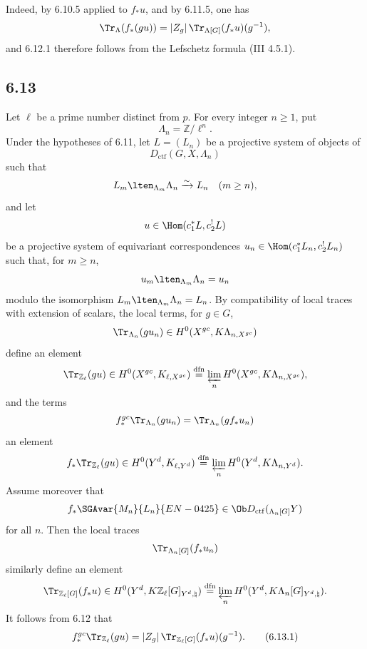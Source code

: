 Indeed, by 6.10.5 applied to $f_*u$, and by 6.11.5, one has
\[
\Tr_{\Lambda}(f_*(gu))=|Z_g|\,\Tr_{\Lambda[G]}(f_*u)(g^{-1}),
\]
and 6.12.1 therefore follows from the Lefschetz formula (III 4.5.1).

\subsection*{6.13}
Let $\ell$ be a prime number distinct from $p$. For every integer $n\ge1$, put
\[
\Lambda_n=\mathbb Z/\ell^n.
\]
Under the hypotheses of 6.11, let $L=(L_n)$ be a projective system of objects of
\[
D_{\mathrm{ctf}}(G,X,\Lambda_n)
\]
such that
\[
L_m\lten_{\Lambda_m}\Lambda_n\xrightarrow{\sim}L_n\quad (m\ge n),
\]
and let
\[
u\in\Hom(c_1^*L,c_2^!L)
\]
be a projective system of equivariant correspondences $u_n\in\Hom(c_1^*L_n,c_2^!L_n)$ such that, for $m\ge n$,
\[
u_m\lten_{\Lambda_m}\Lambda_n=u_n
\]
modulo the isomorphism $L_m\lten_{\Lambda_m}\Lambda_n=L_n$. By compatibility of local traces with extension of scalars, the local terms, for $g\in G$,
\[
\Tr_{\Lambda_n}(gu_n)\in H^0(X^{gc},K\Lambda_{n,X^{gc}})
\]
define an element
\[
\Tr_{\mathbb Z_{\ell}}(gu)\in
H^0(X^{gc},K_{\ell,X^{gc}})
\stackrel{\mathrm{dfn}}{=}
\varprojlim_n H^0(X^{gc},K\Lambda_{n,X^{gc}}),
\]
and the terms
\[
f_*^{gc}\Tr_{\Lambda_n}(gu_n)=\Tr_{\Lambda_n}(gf_*u_n)
\]
an element
\[
f_*\Tr_{\mathbb Z_{\ell}}(gu)\in
H^0(Y^d,K_{\ell,Y^d})
\stackrel{\mathrm{dfn}}{=}
\varprojlim_n H^0(Y^d,K\Lambda_{n,Y^d}).
\]
Assume moreover that
\[
f_*\SGAvar{M_n}{L_n}{EN-0425}\in\Ob D_{\mathrm{ctf}}({}_{\Lambda_n[G]}Y)
\]
for all $n$. Then the local traces
\[
\Tr_{\Lambda_n[G]}(f_*u_n)
\]
similarly define an element
\[
\Tr_{\mathbb Z_{\ell}[G]}(f_*u)\in
H^0(Y^d,K\mathbb Z_{\ell}[G]_{Y^d,\natural})
\stackrel{\mathrm{dfn}}{=}
\varprojlim_n H^0(Y^d,K\Lambda_n[G]_{Y^d,\natural}).
\]
It follows from 6.12 that
\begin{equation}
f_*^{gc}\Tr_{\mathbb Z_{\ell}}(gu)
=
|Z_g|\,\Tr_{\mathbb Z_{\ell}[G]}(f_*u)(g^{-1}).
\tag{6.13.1}
\end{equation}


